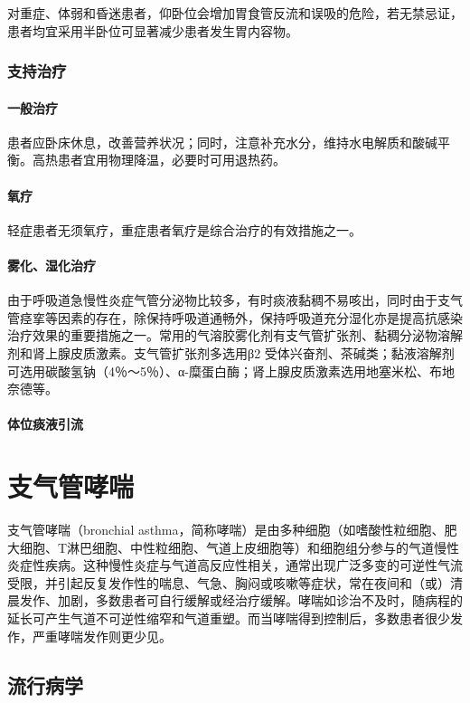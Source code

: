 对重症、体弱和昏迷患者，仰卧位会增加胃食管反流和误吸的危险，若无禁忌证，患者均宜采用半卧位可显著减少患者发生胃内容物。

\subsubsection{支持治疗}
\paragraph{一般治疗}

患者应卧床休息，改善营养状况；同时，注意补充水分，维持水电解质和酸碱平衡。高热患者宜用物理降温，必要时可用退热药。
\paragraph{氧疗}

轻症患者无须氧疗，重症患者氧疗是综合治疗的有效措施之一。
\paragraph{雾化、湿化治疗}

由于呼吸道急慢性炎症气管分泌物比较多，有时痰液黏稠不易咳出，同时由于支气管痉挛等因素的存在，除保持呼吸道通畅外，保持呼吸道充分湿化亦是提高抗感染治疗效果的重要措施之一。常用的气溶胶雾化剂有支气管扩张剂、黏稠分泌物溶解剂和肾上腺皮质激素。支气管扩张剂多选用β{2}
受体兴奋剂、茶碱类；黏液溶解剂可选用碳酸氢钠（4％～5％）、α-糜蛋白酶；肾上腺皮质激素选用地塞米松、布地奈德等。
\paragraph{体位痰液引流}

\section{支气管哮喘}

支气管哮喘（bronchial
asthma，简称哮喘）是由多种细胞（如嗜酸性粒细胞、肥大细胞、T淋巴细胞、中性粒细胞、气道上皮细胞等）和细胞组分参与的气道慢性炎症性疾病。这种慢性炎症与气道高反应性相关，通常出现广泛多变的可逆性气流受限，并引起反复发作性的喘息、气急、胸闷或咳嗽等症状，常在夜间和（或）清晨发作、加剧，多数患者可自行缓解或经治疗缓解。哮喘如诊治不及时，随病程的延长可产生气道不可逆性缩窄和气道重塑。而当哮喘得到控制后，多数患者很少发作，严重哮喘发作则更少见。

\subsection{流行病学}

